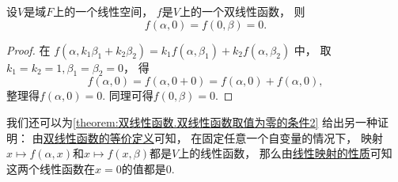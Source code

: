 \begin{property}\label{theorem:双线性函数.双线性函数取值为零的条件2}
设\(V\)是域\(F\)上的一个线性空间，
\(f\)是\(V\)上的一个双线性函数，
则\begin{equation*}
	f(\alpha,0)
	= f(0,\beta)
	= 0.
\end{equation*}
\begin{proof}
在 \hyperref[equation:双线性函数.双线性函数判定条件2]{$
	f(\alpha,k_1\beta_1+k_2\beta_2)
	= k_1 f(\alpha,\beta_1)
	+ k_2 f(\alpha,\beta_2)
$} 中，
取\(k_1=k_2=1,
\beta_1=\beta_2=0\)，
得\begin{equation*}
	f(\alpha,0)
	= f(\alpha,0+0)
	= f(\alpha,0) + f(\alpha,0),
\end{equation*}
整理得\(f(\alpha,0) = 0\).
同理可得\(f(0,\beta) = 0\).
\end{proof}
\end{property}
\begin{remark}
我们还可以为\cref{theorem:双线性函数.双线性函数取值为零的条件2} 给出另一种证明：
由\hyperref[definition:双线性函数.双线性函数的定义2]{双线性函数的等价定义}可知，
在固定任意一个自变量的情况下，
映射\(x \mapsto f(\alpha,x)\)和\(x \mapsto f(x,\beta)\)都是\(V\)上的线性函数，
那么由\hyperref[theorem:线性映射.线性映射的性质]{线性映射的性质}可知
这两个线性函数在\(x=0\)的值都是\(0\).
\end{remark}

